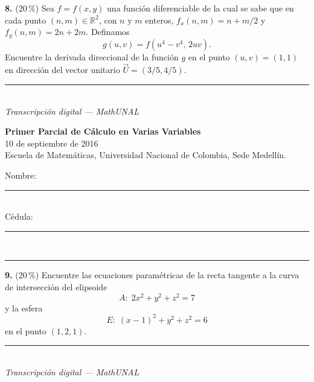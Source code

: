 \documentclass[11pt]{article}
\newcommand{\examheader}{%
  \noindent
  \begin{minipage}[t]{0.62\linewidth}
    {\bfseries\large Primer Parcial de C\'alculo en Varias Variables}\\
    {\small 10 de septiembre de 2016}\\
    {\small Escuela de Matem\'aticas, Universidad Nacional de Colombia, Sede Medell\'in.}
  \end{minipage}%
  \hfill
  \begin{minipage}[t]{0.33\linewidth}
    \raggedleft\small
    Nombre: \rule{2.8cm}{0.4pt}\\[4pt]
    C\'edula: \rule{2.8cm}{0.4pt}
  \end{minipage}\\[4pt]
  \rule{\linewidth}{0.6pt}
}
\newcommand{\examfooter}{%
  \vfill
  \rule{\linewidth}{0.4pt}\\[1pt]
  {\scriptsize\textit{Transcripci\'on digital --- MathUNAL}\hfill\textcolor{unalblue}{\textbf{\thepage}}}
}
\begin{document}
\bigskip
\noindent\textbf{8.} (20\,\%) Sea $f=f(x,y)$ una funci\'on diferenciable de la cual se sabe que en cada punto $(n,m)\in\mathbb{R}^2$, con $n$ y $m$ enteros, $f_x(n,m)=n+m/2$ y $f_y(n,m)=2n+2m$. Definamos
$$g(u,v) = f(u^4-v^4,\, 2uv).$$
Encuentre la derivada direccional de la funci\'on $g$ en el punto $(u,v)=(1,1)$ en direcci\'on del vector unitario $\vec U = (3/5,4/5)$.

\vfill
\examfooter
\newpage
\examheader
\vspace{2pt}

\noindent\textbf{9.} (20\,\%) Encuentre las ecuaciones param\'etricas de la recta tangente a la curva de intersecci\'on del elipsoide
$$A:\; 2x^2+y^2+z^2=7$$
y la esfera
$$E:\; (x-1)^2+y^2+z^2=6$$
en el punto $(1,2,1)$.

\vfill
\examfooter
\end{document}
